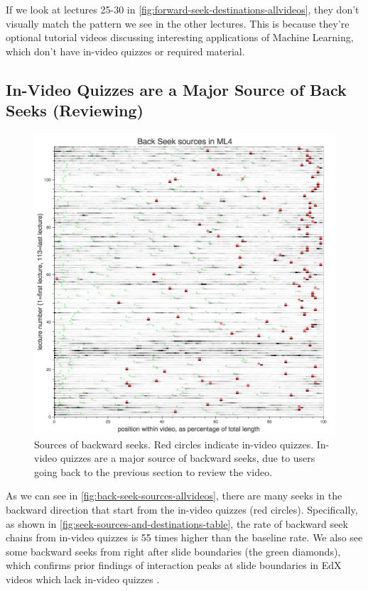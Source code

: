 \documentclass{sigchi}
\begin{document}
If we look at lectures 25-30 in \autoref{fig:forward-seek-destinations-allvideos}, they don't visually match the pattern we see in the other lectures. This is because they're optional tutorial videos discussing interesting applications of Machine Learning, which don't have in-video quizzes or required material.

\subsection{In-Video Quizzes are a Major Source of Back Seeks (Reviewing)}

\begin{figure}
\includegraphics[width=1.0\columnwidth]{back-seek-sources-allvideos}
\caption{Sources of backward seeks. Red circles indicate in-video quizzes. In-video quizzes are a major source of backward seeks, due to users going back to the previous section to review the video.}
\label{fig:back-seek-sources-allvideos}
\end{figure}

As we can see in \autoref{fig:back-seek-sources-allvideos}, there are many seeks in the backward direction that start from the in-video quizzes (red circles). Specifically, as shown in \autoref{fig:seek-sources-and-destinations-table}, the rate of backward seek chains from in-video quizzes is 55 times higher than the baseline rate. We also see some backward seeks from right after slide boundaries (the green diamonds), which confirms prior findings of interaction peaks at slide boundaries in EdX videos which lack in-video quizzes \cite{juho}.
\end{document}
